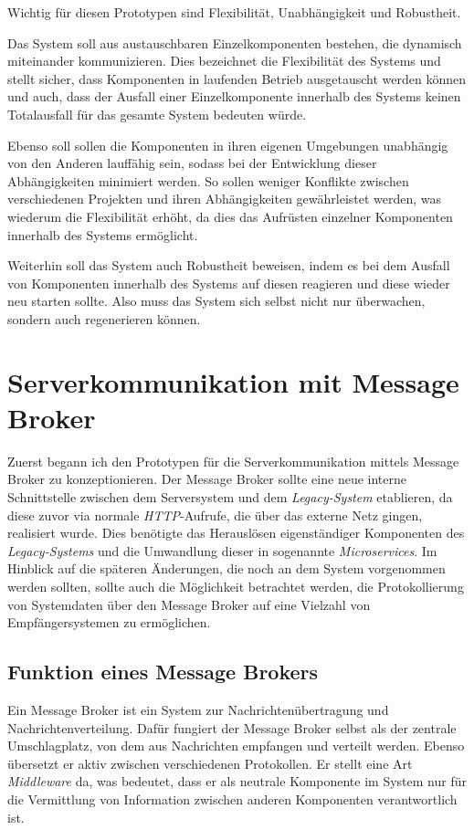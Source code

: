 \documentclass[12pt,a4paper]{scrartcl}
\begin{document}
Wichtig für diesen Prototypen sind Flexibilität, Unabhängigkeit und Robustheit.

Das System soll aus austauschbaren Einzelkomponenten bestehen, die dynamisch miteinander kommunizieren. Dies bezeichnet die Flexibilität des Systems und stellt sicher, dass Komponenten in laufenden Betrieb ausgetauscht werden können und auch, dass der Ausfall einer Einzelkomponente innerhalb des Systems keinen Totalausfall für das gesamte System bedeuten würde.

Ebenso soll sollen die Komponenten in ihren eigenen Umgebungen unabhängig von den Anderen lauffähig sein, sodass bei der Entwicklung dieser Abhängigkeiten minimiert werden. So sollen weniger Konflikte zwischen verschiedenen Projekten und ihren Abhängigkeiten gewährleistet werden, was wiederum die Flexibilität erhöht, da dies das Aufrüsten einzelner Komponenten innerhalb des Systems ermöglicht.

Weiterhin soll das System auch Robustheit beweisen, indem es bei dem Ausfall von Komponenten innerhalb des Systems auf diesen reagieren und diese wieder neu starten sollte. Also muss das System sich selbst nicht nur überwachen, sondern auch regenerieren können. 

\newpage
\section{Serverkommunikation mit Message Broker} \label{rabbit}
Zuerst begann ich den Prototypen für die Serverkommunikation mittels Message Broker zu konzeptionieren. Der Message Broker sollte eine neue interne Schnittstelle zwischen dem Serversystem und dem \emph{Legacy-System} etablieren, da diese zuvor via normale \emph{HTTP}-Aufrufe, die über das externe Netz gingen, realisiert wurde. Dies benötigte das Herauslösen eigenständiger Komponenten des \emph{Legacy-Systems} und die Umwandlung dieser in sogenannte \emph{Microservices}. Im Hinblick auf die späteren Änderungen, die noch an dem System vorgenommen werden sollten, sollte auch die Möglichkeit betrachtet werden, die Protokollierung von Systemdaten über den Message Broker auf eine Vielzahl von Empfängersystemen zu ermöglichen.

\subsection{Funktion eines Message Brokers}
Ein Message Broker ist ein System zur Nachrichtenübertragung und Nachrichtenverteilung. Dafür fungiert der Message Broker selbst als der zentrale Umschlagplatz, von dem aus Nachrichten empfangen und verteilt werden. Ebenso übersetzt er aktiv zwischen verschiedenen Protokollen\cite{mesBro}. Er stellt eine Art \emph{Middleware} da, was bedeutet, dass er als neutrale Komponente im System nur für die Vermittlung von Information zwischen anderen Komponenten verantwortlich ist.
\end{document}

